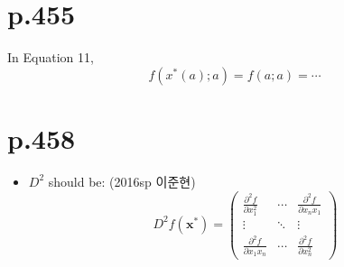 \documentclass[a4paper]{article}
\begin{document}
\section{p.455} %
\label{sec:p_455}
In Equation 11, \[
	f(x^\ast(a);a)=f(a;a)= \cdots
\]

\section{p.458} %
\label{sec:p_458}

\begin{itemize}
	\item $D^2$ should be: (2016sp 이준현)
	\[
		D^2 f(\mathbf{x^\ast}) = \begin{pmatrix}
			\frac{\partial^2 f}{\partial x_1^2} & \cdots & \frac{\partial^2 f}{\partial x_nx_1}\\
			\vdots & \ddots & \vdots \\
			\frac{\partial^2 f}{\partial x_1x_n} & \cdots & \frac{\partial^2 f}{\partial x_n^2}
		\end{pmatrix}
	\]
\end{itemize}

\end{document}
